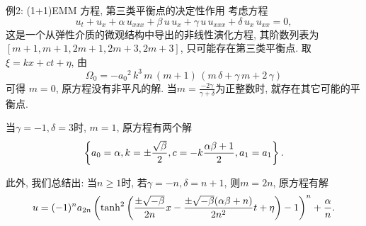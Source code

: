 \begin{frame}{例2: (1+1)EMM 方程, 第三类平衡点的决定性作用}
考虑方程
\begin{equation*}
    {{u}_{t}}+{{u}_{x}}+\alpha\,{{u}_{xxx}}+\beta\,u\,{{u}_{x}}+\gamma\,u\,{{u}_{xxx}}+\delta\,{{u}_{x}}\,{{u}_{xx}}=0,
\end{equation*}
这是一个从弹性介质的微观结构中导出的非线性演化方程, 其阶数列表为$[m+1,m+1,2m+1,2m+3,2m+3]$, 只可能存在第三类平衡点.  取$\xi=kx+ct+\eta$, 由
\begin{equation*}
    \Omega_0=-{{{a}_{0}}}^{2}\,{k}^{3}\,m\,\left( m+1\right) \,\left( m\,\delta+\gamma\,m+2\,\gamma\right)
\end{equation*}
可得 $m=0$, 原方程没有非平凡的解. 当$m=\frac{-2 \gamma}{\gamma+\delta}$为正整数时, 就存在其它可能的平衡点.
\end{frame}

\begin{frame}
当$\gamma=-1,\delta=3$时, $m=1$, 原方程有两个解 
\begin{equation*}
    \left\{a_0=\alpha,k=\pm\frac{\sqrt{\beta}}{2},c=-k\frac{\alpha \beta+1}{2},a_1=a_1\right\}.
\end{equation*}

此外, 我们总结出: 当$n\ge 1$时, 若$\gamma=-n,\delta=n+1$, 则$m=2n$, 原方程有解 
\begin{equation*}
u=(-1)^n a_{2n} \left(\tanh^2\left(\frac{\pm\sqrt{-\beta}}{2n}x-\frac{\pm\sqrt{-\beta}(\alpha\beta+n)}{2n^2}t+\eta\right)-1\right)^n+\frac{\alpha}{n} .
\end{equation*}
\end{frame}